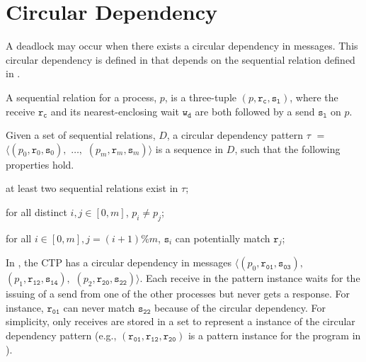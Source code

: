 \section{Circular Dependency}



A deadlock may occur when there exists a circular dependency in messages. This circular dependency is defined in  that depends on the sequential relation defined in .

\begin{definition}
A sequential relation for a process, $p$, is a three-tuple $(p, \mathtt{r_c}, \mathtt{s_l})$, where the receive $\mathtt{r_c}$ and its nearest-enclosing wait $\mathtt{w_d}$ are both followed by a send $\mathtt{s_l}$ on $p$. 
\label{def:seqrelation}
\end{definition}

\begin{definition}
Given a set of sequential relations, $D$, a circular dependency pattern $\tau$ $=$ $\langle(p_0, \mathtt{r}_0, \mathtt{s}_0),$ $\ldots,$ $(p_m, \mathtt{r}_m, \mathtt{s}_m)\rangle$ is a sequence in $D$, such that the following properties hold.
\begin{compactenum}
\item at least two sequential relations exist in $\tau$;
\item for all distinct $i,j \in [0,m]$, $p_i \neq p_j$;
\item for all $i \in [0,m], j = (i+1) \% m$, $\mathtt{s}_i$ can potentially match $\mathtt{r}_j$;
\end{compactenum}
\label{def:circular}
\end{definition}

In , the CTP has a circular dependency in messages $\langle(p_0, \mathtt{r_{01}}, \mathtt{s_{03}}),$ $(p_1, \mathtt{r_{12}}, \mathtt{s_{14}}),$ $(p_2, \mathtt{r_{20}}, \mathtt{s_{22}})\rangle$. Each receive in the pattern instance waits for the issuing of a send from one of the other processes but never gets a response. For instance, $\mathtt{r_{01}}$ can never match $\mathtt{s_{22}}$ because of the circular dependency. For simplicity, only receives are stored in a set to represent a instance of the circular dependency pattern (e.g., $(\mathtt{r_{01}}, \mathtt{r_{12}}, \mathtt{r_{20}})$ is a pattern instance for the program in ). 

